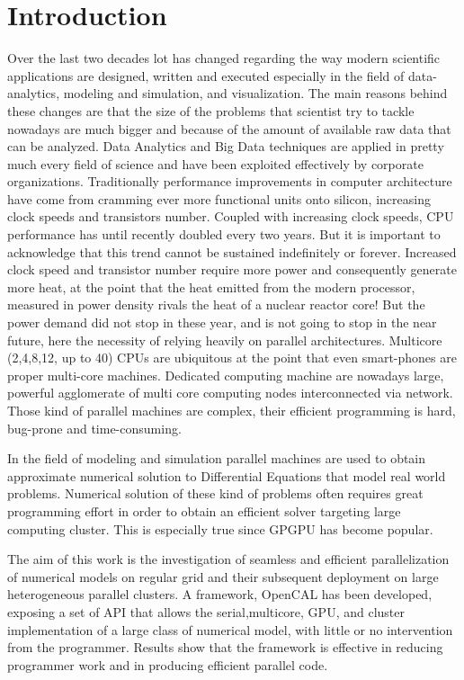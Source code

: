 \chapter{Introduction}
Over the last two decades lot has changed regarding the way modern scientific applications are designed, written and executed especially in the field of data-analytics, modeling and simulation, and visualization. The main reasons behind these changes are that the size of the problems that scientist try to tackle nowadays are much bigger and because of the amount of available raw data that can be analyzed. Data Analytics and Big Data techniques are applied in pretty much every field of science and have been exploited effectively by corporate organizations. 
Traditionally performance improvements in computer architecture have come from cramming ever more functional units onto silicon, increasing clock speeds and transistors number. Coupled with increasing clock speeds, CPU performance has until recently doubled every two years.  But it is important to acknowledge that this trend cannot be sustained indefinitely or forever. Increased clock speed and transistor number require more power and consequently generate more heat, at the point that the heat emitted from the modern processor, measured in power density rivals the heat of a nuclear reactor core!
But the power demand did not stop in these year, and is not going to stop in the near future, here the necessity of relying heavily on parallel architectures. Multicore (2,4,8,12, up to 40) CPUs  are ubiquitous at the point that even smart-phones are proper multi-core machines. Dedicated computing machine are nowadays large, powerful agglomerate of multi core computing nodes interconnected via network. Those kind of parallel machines are complex, their efficient programming is hard, bug-prone and time-consuming. 

In the field of modeling and simulation parallel machines are used to obtain approximate numerical solution to Differential Equations that model real world problems. Numerical solution of these kind of problems often requires great programming effort in order to obtain an efficient solver targeting large computing cluster. This is especially true since GPGPU has become popular.

The aim of this work is the investigation of seamless and efficient parallelization of numerical models on regular grid and their subsequent deployment on large heterogeneous  parallel clusters. 
A framework, OpenCAL has been developed, exposing a set of API that allows the serial,multicore, GPU, and cluster implementation of a large class of numerical model, with little or no intervention from the programmer.
Results show that the framework is effective in reducing programmer work and in producing efficient parallel code.

